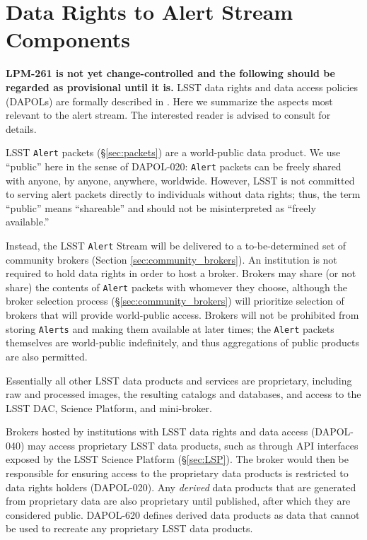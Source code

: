 \section{Data Rights to Alert Stream Components}\label{sec:data_rights}

\textbf{LPM-261 is not yet change-controlled and the following should be regarded as provisional until it is.}
LSST data rights and data access policies (DAPOLs) are formally described in . 
Here we summarize the aspects most relevant to the alert stream. 
The interested reader is advised to consult  for details.

LSST {\tt Alert} packets (\S \ref{sec:packets}) are a world-public data product.
We use ``public'' here in the sense of DAPOL-020:  \texttt{Alert} packets can be freely shared with anyone, by anyone, anywhere, worldwide.
However, LSST is not committed to serving alert packets directly to individuals without data rights;
thus, the term ``public'' means ``shareable'' and should not be misinterpreted as ``freely available.''

Instead, the LSST {\tt Alert} Stream will be delivered to a to-be-determined set of community brokers (Section \ref{sec:community_brokers}).
An institution is not required to hold data rights in order to host a broker.
Brokers may share (or not share) the contents of {\tt Alert} packets with whomever they choose,
although the broker selection process (\S \ref{sec:community_brokers}) will prioritize selection of brokers that will provide world-public access.
Brokers will not be prohibited from storing {\tt Alerts} and making them available at later times;
the {\tt Alert} packets themselves are world-public indefinitely, and thus aggregations of public products are also permitted.

Essentially all other LSST data products and services are proprietary, including raw and processed images, the resulting catalogs and databases, and access to the LSST DAC, Science Platform, and mini-broker.

Brokers hosted by institutions with LSST data rights and data access (DAPOL-040) may access proprietary LSST data products, such as through API interfaces exposed by the LSST Science Platform (\S \ref{sec:LSP}).
The broker would then be responsible for ensuring access to the proprietary data products is restricted to data rights holders (DAPOL-020).
Any \textit{derived} data products that are generated from proprietary data are also proprietary until published, after which they are considered public. 
DAPOL-620 defines derived data products as data that cannot be used to recreate any proprietary LSST data products.

